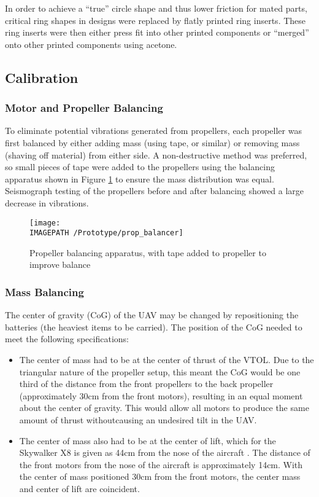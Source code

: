 In order to achieve a ``true'' circle shape and thus lower friction for mated parts, critical ring shapes in designs were replaced by flatly printed ring inserts. These ring inserts were then either press fit into other printed components or ``merged'' onto other printed components using acetone. 

\subsection{Calibration}
\subsubsection*{Motor and Propeller Balancing}
To eliminate potential vibrations generated from propellers, each propeller was first balanced by either adding mass (using tape, or similar) or removing mass (shaving off material) from either side. A non-destructive method was preferred, so small pieces of tape were added to the propellers using the balancing apparatus shown in Figure \ref{fig:propbalancing} to ensure the mass distribution was equal.  Seismograph testing of the propellers before and after balancing showed a large decrease in vibrations.

\begin{figure}[!ht]
	\centering
	\texttt{[image: \\IMAGEPATH /Prototype/prop\_balancer]}
	\caption{Propeller balancing apparatus, with tape added to propeller to improve balance}
	\label{fig:propbalancing}
\end{figure}

\subsubsection*{Mass Balancing}
The center of gravity (CoG) of the UAV may be changed by repositioning the batteries (the heaviest items to be carried). The position of the CoG needed to meet the following specifications:

\begin{itemize}
	\item The center of mass had to be at the center of thrust of the VTOL. Due to the triangular nature of the propeller setup, this meant the CoG would be one third of the distance from the front propellers to the back propeller (approximately 30cm from the front motors), resulting in an equal moment about the center of gravity. This would allow all motors to produce the same amount of thrust withoutcausing an undesired tilt in the UAV.
	\item The center of mass also had to be at the center of lift, which for the Skywalker X8 is given as 44cm from the nose of the aircraft . The distance of the front motors from the nose of the aircraft is approximately 14cm. With the center of mass positioned 30cm from the front motors, the center mass and center of lift are coincident.
\end{itemize}
	
